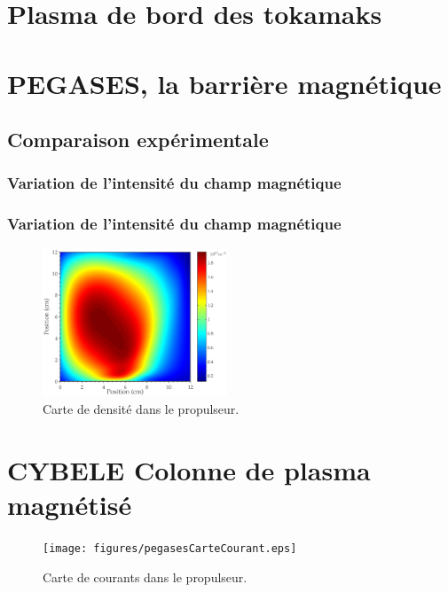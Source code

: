\begin{refsection}

	\section{Plasma de bord des tokamaks}
		 
	\section{PEGASES, la barrière magnétique}
		\subsection{Comparaison expérimentale}
			
			\subsubsection{Variation de l'intensité du champ magnétique}
			\subsubsection{Variation de l'intensité du champ magnétique}
\begin{figure}[htbp]
\centering
\includegraphics[width=5.5cm]{figures/pegasescarteDensite.eps}
{\caption{Carte de densité dans le propulseur.} \label{4-pegasesDensite}}
\end{figure}
	
	\section{CYBELE Colonne de plasma magnétisé}
	\begin{figure}[htbp]
	\texttt{[image: figures/pegasesCarteCourant.eps]}{
	\caption{Carte de courants dans le propulseur.} \label{4-pegasesCourants}}
\end{figure}
		
	
%
%
\end{refsection}
